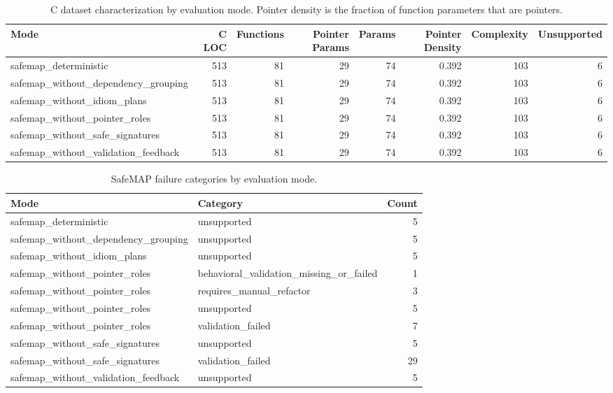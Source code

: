 \begin{table}[t]
\centering
\caption{C dataset characterization by evaluation mode. Pointer density is the fraction of function parameters that are pointers.}
\label{tab:safemap-dataset-characterization}
\begin{tabular}{lrrrrrrr}
\hline
Mode & C LOC & Functions & Pointer Params & Params & Pointer Density & Complexity & Unsupported \\
\hline
safemap\_deterministic & 513 & 81 & 29 & 74 & 0.392 & 103 & 6 \\
safemap\_without\_dependency\_grouping & 513 & 81 & 29 & 74 & 0.392 & 103 & 6 \\
safemap\_without\_idiom\_plans & 513 & 81 & 29 & 74 & 0.392 & 103 & 6 \\
safemap\_without\_pointer\_roles & 513 & 81 & 29 & 74 & 0.392 & 103 & 6 \\
safemap\_without\_safe\_signatures & 513 & 81 & 29 & 74 & 0.392 & 103 & 6 \\
safemap\_without\_validation\_feedback & 513 & 81 & 29 & 74 & 0.392 & 103 & 6 \\
\hline
\end{tabular}
\end{table}

\begin{table}[t]
\centering
\caption{SafeMAP failure categories by evaluation mode.}
\label{tab:safemap-failure-summary}
\begin{tabular}{llr}
\hline
Mode & Category & Count \\
\hline
safemap\_deterministic & unsupported & 5 \\
safemap\_without\_dependency\_grouping & unsupported & 5 \\
safemap\_without\_idiom\_plans & unsupported & 5 \\
safemap\_without\_pointer\_roles & behavioral\_validation\_missing\_or\_failed & 1 \\
safemap\_without\_pointer\_roles & requires\_manual\_refactor & 3 \\
safemap\_without\_pointer\_roles & unsupported & 5 \\
safemap\_without\_pointer\_roles & validation\_failed & 7 \\
safemap\_without\_safe\_signatures & unsupported & 5 \\
safemap\_without\_safe\_signatures & validation\_failed & 29 \\
safemap\_without\_validation\_feedback & unsupported & 5 \\
\hline
\end{tabular}
\end{table}

